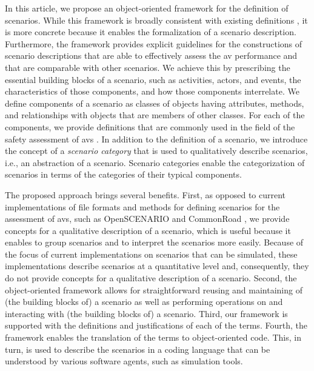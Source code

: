 \cstartc In this article, we propose an object-oriented framework for the definition of scenarios. While this framework is broadly consistent with existing definitions \autocite{geyer2014, ulbrich2015, elrofai2016scenario}, it is more concrete because it enables the formalization of a scenario description. 
Furthermore, the framework provides explicit guidelines for the constructions of scenario descriptions that are able to effectively assess the \ac{av} performance and that are comparable with other scenarios.
We achieve this by prescribing the essential building blocks of a scenario, such as activities, actors, and events, the characteristics of those components, and how those components interrelate. 
We define components of a scenario as classes of objects having attributes, methods, and relationships with objects that are members of other classes.
For each of the components, we provide definitions that are commonly used in the field of the safety assessment of \acp{av} \autocite{geyer2014, ulbrich2015, catapult2018musicc, catapult2018regulating, sigsim2019glossary, openscenario}. 
In addition to the definition of a scenario, we introduce the concept of a \emph{scenario category} that is used to qualitatively describe scenarios, i.e., an abstraction of a scenario. Scenario categories enable the categorization of scenarios in terms of the categories of their typical components.

The proposed approach brings several benefits.
First, as opposed to current implementations of file formats and methods for defining scenarios for the assessment of \acp{av}, such as OpenSCENARIO \autocite{openscenario} and CommonRoad \autocite{althoff2017CommonRoad}, we provide concepts for a qualitative description of a scenario, which is useful because it enables to group scenarios and to interpret the scenarios more easily. Because of the focus of current implementations \autocite{openscenario,althoff2017CommonRoad} on scenarios that can be simulated, these implementations describe scenarios at a quantitative level and, consequently, they do not provide concepts for a qualitative description of a scenario.
Second, the object-oriented framework allows for straightforward reusing and maintaining of (the building blocks of) a scenario as well as performing operations on and interacting with (the building blocks of) a scenario.
Third, our framework is supported with the definitions and justifications of each of the terms.
Fourth, the framework enables the translation of the terms to object-oriented code.
This, in turn, is used to describe the scenarios in a coding language that can be understood by various software agents, such as simulation tools. 

